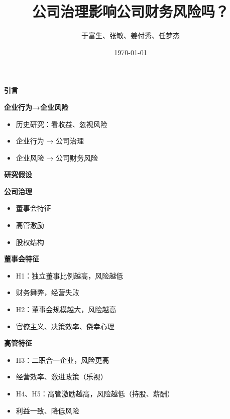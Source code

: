 \documentclass[aspectratio=169,UTF8,zihao=-4]{ctexbeamer}
\title{公司治理影响公司财务风险吗？}
\author{于富生、张敏、姜付秀、任梦杰}
\date{\today}
\newcommand{\bigidea}[1]{
  \begin{center}
    \vspace{0.8em}
    {\LARGE \bfseries #1}
    \vspace{0.6em}
  \end{center}
}
\newcommand{\sectionpageframe}[1]{
  \begin{frame}[plain]
    \begin{center}
      \vfill
      {\Huge \bfseries #1}
      \vfill
    \end{center}
  \end{frame}
}
\begin{document}
\begin{frame}[plain]
  \titlepage
\end{frame}

\sectionpageframe{引言}

\begin{frame}
  \bigidea{企业行为→企业风险}
  \begin{itemize}
    \item \Large 历史研究：看收益、忽视风险
    \item \Large 企业行为 → 公司治理 
    \item \Large 企业风险 → 公司财务风险
  \end{itemize}
\end{frame}

\sectionpageframe{研究假设}

\begin{frame}
  \bigidea{公司治理}
  \begin{itemize}
    \item \Large 董事会特征
    \item \Large 高管激励
    \item \Large 股权结构
  \end{itemize}
\end{frame}

\begin{frame}
  \bigidea{董事会特征}
  \begin{itemize}
    \item \Large H1：独立董事比例越高，风险越低
    \item \Large 财务舞弊，经营失败
    \item \Large H2：董事会规模越大，风险越高
    \item \Large 官僚主义、决策效率、侥幸心理
  \end{itemize}
\end{frame}

\begin{frame}
  \bigidea{高管特征}
  \begin{itemize}
    \item \Large H3：二职合一企业，风险更高
    \item \Large 经营效率、激进政策（乐视）
    \item \Large H4、H5：高管激励越高，风险越低（持股、薪酬）
    \item \Large 利益一致、降低风险
  \end{itemize}
  \vspace{0.8em}
\end{frame}
\end{document}

